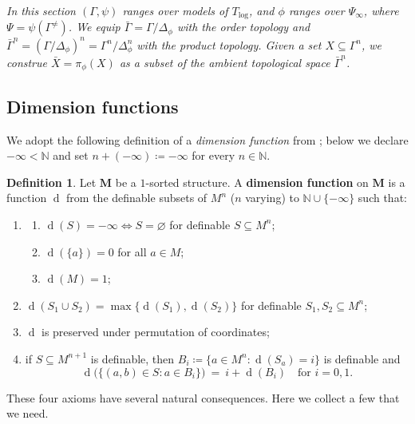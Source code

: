 \documentclass[11pt]{amsart}
\theoremstyle{plain}
\theoremstyle{definition}
\newtheorem{definition}[thm]{Definition}
\numberwithin{equation}{section}
\newcommand\N{\mathbb{N}}
\newcommand\0{\varnothing}
\renewcommand\d{\operatorname{d}}
\begin{document}
\medskip\noindent
\emph{In this section $(\Gamma,\psi)$ ranges over models of $T_{\log}$, and $\phi$ ranges over $\Psi_{\infty}$, where $\Psi=\psi(\Gamma^{\neq})$. We equip $\bar{\Gamma}=\Gamma/\Delta_{\phi}$ with the order topology and $\bar{\Gamma}^n=(\Gamma/\Delta_{\phi})^n=\Gamma^n/\Delta_{\phi}^n$ with the product topology. Given a set $X\subseteq\Gamma^n$, we construe $\bar{X}=\pi_{\phi}(X)$ as a subset of the ambient topological space $\bar{\Gamma}^n$.}



\subsection{Dimension functions}\label{subsec_dimfun}
We adopt the following definition of a \emph{dimension function} from \cite{vdD89}; below we declare $-\infty<\N$ and set $n+(-\infty)\coloneqq -\infty$ for every $n\in\N$.

\begin{definition}\label{def_dimfn}
Let $\bm{M}$ be a $1$-sorted structure.
A \textbf{dimension function} on $\bm{M}$ is a function $\d$ from the definable subsets of $M^n$ ($n$ varying) to $\N\cup\{-\infty\}$ such that:
\begin{enumerate}[label=(D\arabic*)]
    \item\label{D1}
        \begin{enumerate}[label=(\alph*)]
            \item\label{D1a} $\d(S)=-\infty \Leftrightarrow S=\0$ for definable $S \subseteq M^n$;
            \item\label{D1b} $\d(\{a\})=0$ for all $a \in M$;
            \item\label{D1c} $\d(M)=1$;
        \end{enumerate}
    \item\label{D2} $\d(S_1\cup S_2)=\max\{\d(S_1), \d(S_2)\}$ for definable $S_1,S_2 \subseteq M^n$;
    \item\label{D3} $\d$ is preserved under permutation of coordinates;
    \item\label{D4} if $S \subseteq M^{n+1}$ is definable, then $B_i\coloneqq \{ a\in M^n : \d(S_a)=i \}$ is definable and
    \[
    \d\big(\{(a,b)\in S : a\in B_i \}\big)\ =\ i + \d(B_i) \quad\text{for $i=0,1$.}
    \]
\end{enumerate}
\end{definition}

\noindent
These four axioms have several natural consequences. Here we collect a few that we need.
\end{document}
